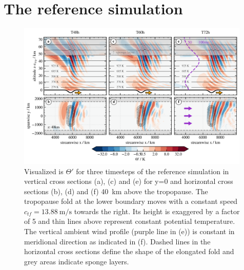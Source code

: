 \section{The reference simulation}
\label{sec:resultsq3D-reference}
\begin{figure}[t]
    \centering
    \includegraphics[width=0.99\textwidth]{figures_q3D/Q3D-th-referenceSim.png}
    \caption{Visualized is $\Theta'$ for three timesteps of the reference simulation in vertical cross sections (a), (c) and (e) for y=0 and horizontal cross sections (b), (d) and (f) \SI{40}{\kilo\meter} above the tropopause. The tropopause fold at the lower boundary moves with a constant speed $c_{tf}=\SI{13.88}{\meter\per\second}$ towards the right. Its height is exaggered by a factor of 5 and thin lines above represent constant potential temperature. The vertical ambient wind profile (purple line in (e)) is constant in meridional direction as indicated in (f). Dashed lines in the horizontal cross sections define the shape of the elongated fold and grey areas indicate sponge layers.}
    \label{fig:q3D_referenceSim}
\end{figure}
%
